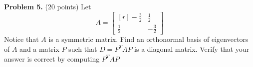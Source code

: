 \documentclass[12pt]{article}
\begin{document}
\clearpage

\textbf{Problem 5.} (20 points) 
Let
\[
A=\begin{bmatrix*}[r]- \frac{3}{2} & \frac{1}{2}\\\frac{1}{2} & - \frac{3}{2}\end{bmatrix*}
\]
Notice that $A$ is a symmetric matrix.
Find an orthonormal basis of eigenvectors of $A$ and a matrix $P$ such that $D=P^TAP$ 
is a diagonal matrix. Verify that your answer is correct by computing $P^TAP$

\end{document}

